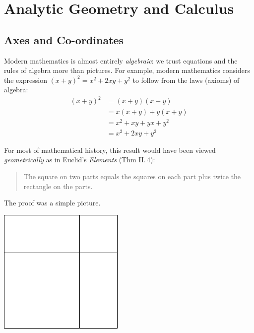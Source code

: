 \graphicspath{{8analytic/pics/}}
\section{Analytic Geometry and Calculus}

\subsection{Axes and Co-ordinates}

Modern mathematics is almost entirely \emph{algebraic}: we trust equations and the rules of algebra more than pictures. For example, modern mathematics considers the expression $(x+y)^2=x^2+2xy+y^2$ to follow from the laws (axioms) of algebra:
\begin{align*}
	(x+y)^2&=(x+y)(x+y)\tag*{(definition of `square')}\\
	&=x(x+y)+y(x+y)\tag*{(distributive law)}\\
	&=x^2+xy+yx+y^2\tag*{(distributive law twice more)}\\
	&=x^2+2xy+y^2\tag*{(commutativity)}
\end{align*}
\begin{minipage}[t]{0.72\linewidth}\vspace{0pt}
	For most of mathematical history, this result would have been viewed \emph{geometrically} as in Euclid's \emph{Elements} (Thm II.\,4):
	\begin{quote}
		The square on two parts equals the squares on each part plus twice the rectangle on the parts.
	\end{quote}
	The proof was a simple picture.
\end{minipage}
\hfill
\begin{minipage}[t]{0.25\linewidth}\vspace{0pt}
	\flushright\includegraphics{analytic-euclid}
\end{minipage}
\smallbreak

